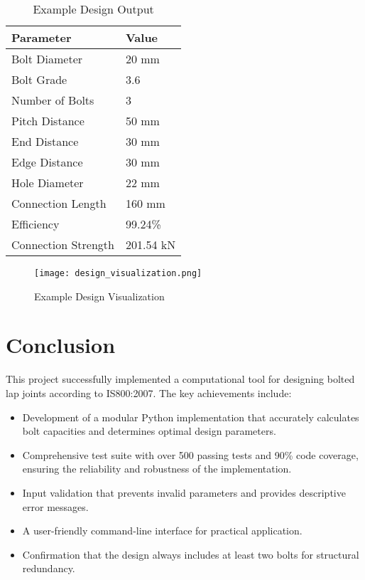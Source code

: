 \documentclass[12pt,a4paper]{article}
\begin{document}
\begin{table}[h]
\centering
\begin{tabular}{@{}ll@{}}
\toprule
\textbf{Parameter} & \textbf{Value} \\
\midrule
Bolt Diameter & 20 mm \\
Bolt Grade & 3.6 \\
Number of Bolts & 3 \\
Pitch Distance & 50 mm \\
End Distance & 30 mm \\
Edge Distance & 30 mm \\
Hole Diameter & 22 mm \\
Connection Length & 160 mm \\
Efficiency & 99.24\% \\
Connection Strength & 201.54 kN \\
\bottomrule
\end{tabular}
\caption{Example Design Output}
\end{table}

\begin{figure}[H]
\centering
\texttt{[image: design\_visualization.png]}
\caption{Example Design Visualization}
\label{fig:design}
\end{figure}

\section{Conclusion}
This project successfully implemented a computational tool for designing bolted lap joints according to IS800:2007. The key achievements include:

\begin{itemize}
    \item Development of a modular Python implementation that accurately calculates bolt capacities and determines optimal design parameters.
    \item Comprehensive test suite with over 500 passing tests and 90\% code coverage, ensuring the reliability and robustness of the implementation.
    \item Input validation that prevents invalid parameters and provides descriptive error messages.
    \item A user-friendly command-line interface for practical application.
    \item Confirmation that the design always includes at least two bolts for structural redundancy.
\end{itemize}
\end{document}
